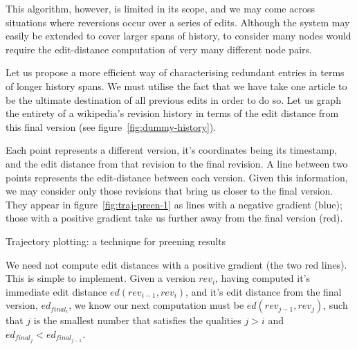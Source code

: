 This algorithm, however, is limited in its scope, and we may
come across situations where reversions occur over a series of
edits. Although the system may easily be extended to cover
larger spans of history, to consider many nodes would require
the edit-distance computation of very many different node
pairs. 

Let us propose a more efficient way of characterising redundant
entries in terms of longer history spans. We must utilise the fact
that we have take one article to be the ultimate destination of all
previous edits in order to do so. Let us graph the entirety of a
wikipedia's revision history in terms of the edit distance from this
final version (see figure~\ref{fig:dummy-history}).

Each point represents a different version, it's coordinates being its
timestamp, and the edit distance from that revision to the final
revision. A line between two points represents the edit-distance
between each version. Given this information, we may consider only
those revisions that bring us closer to the final version. They appear
in figure~\ref{fig:traj-preen-1} as lines with a negative gradient
(blue); those with a positive gradient take us further away from the
final version (red).

\begin{floatingfigure}[p]{0.4\textwidth}
  \centering
  \pgfplotsset{width=0.4\textwidth}
  \caption{Trajectory plotting: a technique for preening results}
  \label{fig:traj-preen-1}
\end{floatingfigure}

We need not compute edit distances with a positive gradient (the two
red lines). This is simple to implement. Given a version $rev_i$, having
computed it's immediate edit distance $ed(rev_{i-1},rev_i)$, and it's edit
distance from the final version, $ed_{final_i}$, we know our next
computation must be $ed(rev_{j-1},rev_j)$, such that $j$ is the smallest
number that satisfies the qualities $j > i$ and $ed_{final_j} <
ed_{final_{j-1}}$.

